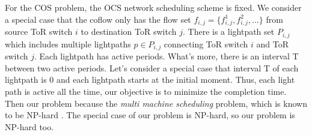 \begin{IEEEproof}
For the COS problem, the OCS network scheduling scheme is fixed. We consider a special case that the coflow only has the flow set $f_{i,j}=\{f_{i,j}^1,f_{i,j}^2,...\}$ from source ToR switch $i$ to destination ToR switch $j$. There is a lightpath set $P_{i,j}$ which includes multiple lightpaths $p\in P_{i,j}$ connecting ToR switch $i$ and ToR switch $j$. Each lightpath has active periods. What's more, there is an interval T between two active periods. Let's consider a special case that interval T of each lightpath is 0 and each lightpath starts at the initial moment. Thus, each light path is active all the time, our objective is to minimize the completion time. Then our problem because the \emph{multi machine scheduling} problem, which is known to be NP-hard \cite{mosheiov1998multi}. The special case of our problem is NP-hard, so our problem is NP-hard too.
\end{IEEEproof}
